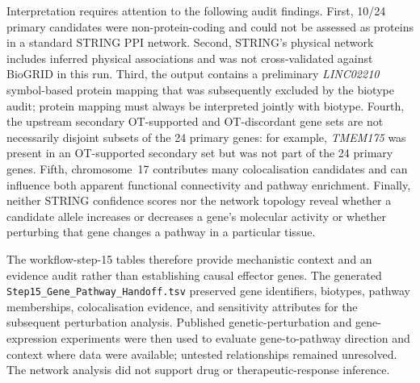 \documentclass[11pt,a4paper]{article}
\begin{document}
Interpretation requires attention to the following audit findings. First, 10/24 primary candidates were non-protein-coding and could not be assessed as proteins in a standard STRING PPI network. Second, STRING's physical network includes inferred physical associations and was not cross-validated against BioGRID in this run. Third, the output contains a preliminary \textit{LINC02210} symbol-based protein mapping that was subsequently excluded by the biotype audit; protein mapping must always be interpreted jointly with biotype. Fourth, the upstream secondary OT-supported and OT-discordant gene sets are not necessarily disjoint subsets of the 24 primary genes: for example, \textit{TMEM175} was present in an OT-supported secondary set but was not part of the 24 primary genes. Fifth, chromosome~17 contributes many colocalisation candidates and can influence both apparent functional connectivity and pathway enrichment. Finally, neither STRING confidence scores nor the network topology reveal whether a candidate allele increases or decreases a gene's molecular activity or whether perturbing that gene changes a pathway in a particular tissue.

The workflow-step-15 tables therefore provide mechanistic context and an evidence audit rather than establishing causal effector genes. The generated \nolinkurl{Step15_Gene_Pathway_Handoff.tsv} preserved gene identifiers, biotypes, pathway memberships, colocalisation evidence, and sensitivity attributes for the subsequent perturbation analysis. Published genetic-perturbation and gene-expression experiments were then used to evaluate gene-to-pathway direction and context where data were available; untested relationships remained unresolved. The network analysis did not support drug or therapeutic-response inference.




%
%
\end{document}
